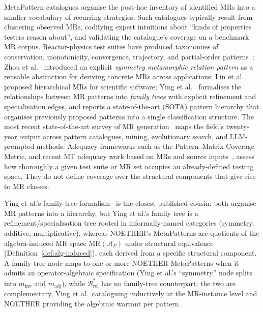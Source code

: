 \documentclass[acmsmall,screen,anonymous,review]{acmart}
\begin{document}
MetaPattern catalogues organise the post-hoc inventory of identified MRs into a smaller vocabulary of recurring strategies. Such catalogues typically result from clustering observed MRs, codifying expert intuitions about ``kinds of properties testers reason about'', and validating the catalogue's coverage on a benchmark MR corpus. Reactor-physics test suites have produced taxonomies of conservation, monotonicity, convergence, trajectory, and partial-order patterns~\cite{BellGlasstone1970, LewisMiller1993}; Zhou et al.~\cite{Zhou2020SymmetryMRP} introduced an explicit \emph{symmetry metamorphic relation pattern} as a reusable abstraction for deriving concrete MRs across applications; Lin et al.~\cite{Lin2018HierarchicalMR} proposed hierarchical MRs for scientific software; Ying et al.~\cite{Ying2025MRPatterns} formalises the relationships between MR patterns into \emph{family trees} with explicit refinement and specialisation edges, and reports a state-of-the-art (SOTA) pattern hierarchy that organises previously proposed patterns into a single classification structure. The most recent state-of-the-art survey of MR generation~\cite{LiTOSEM2025} maps the field's twenty-year output across pattern catalogues, mining, evolutionary search, and LLM-prompted methods. Adequacy frameworks such as the Pattern--Matrix Coverage Metric, and recent MT adequacy work based on MRs and source inputs~\cite{Fu2024MTAdequacy}, assess how thoroughly a given test suite or MR set occupies an already-defined testing space. They do not define coverage over the structural components that give rise to MR classes.

Ying et al.'s family-tree formalism~\cite{Ying2025MRPatterns} is the closest published cousin: both organise MR patterns into a hierarchy, but Ying et al.'s family tree is a refinement/specialisation tree rooted in informally-named categories (symmetry, additive, multiplicative), whereas NOETHER's MetaPatterns are quotients of the algebra-induced MR space $\mathrm{MR}(\mathcal{A}_P)$ under structural equivalence (Definition~\ref{def:alg-induced}), each derived from a specific structural component. A family-tree node maps to one or more NOETHER MetaPatterns when it admits an operator-algebraic specification (Ying et al.'s ``symmetry'' node splits into $m_{\mathrm{inv}}$ and $m_{\mathrm{adj}}$), while $\mathcal{B}^{*}_{\mathrm{rel}}$ has no family-tree counterpart; the two are complementary, Ying et al.\ cataloguing inductively at the MR-instance level and NOETHER providing the algebraic warrant per pattern.
\end{document}
